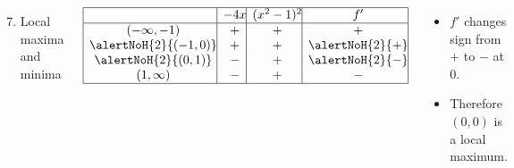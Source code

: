 \begin{frame}[t]
\begin{example}
\begin{columns}[t]
\begin{enumerate}
\setcounter{enumi}{6}
\item  Local maxima and minima
\end{enumerate}
\[
\begin{array}{|c@{}|c@{}|c@{}|c@{}|}
\hline
& -4x & (x^2-1)^2 & f' \\
\hline
(-\infty , -1) & + & + & + \\
\alertNoH{ 2}{(-1 , 0)} & + & + & \alertNoH{ 2}{+} \\
\alertNoH{ 2}{(0 , 1)} & - & + & \alertNoH{ 2}{-} \\
(1 , \infty) & - & + & - \\
\hline
\end{array}
\]
\begin{itemize}
\item<2->  $f'$ changes sign from $+$ to $-$ at $0$.
\item<3->  Therefore $(0,0)$ is a local maximum.
\end{itemize}
\end{columns}
\end{example}
\end{frame}

